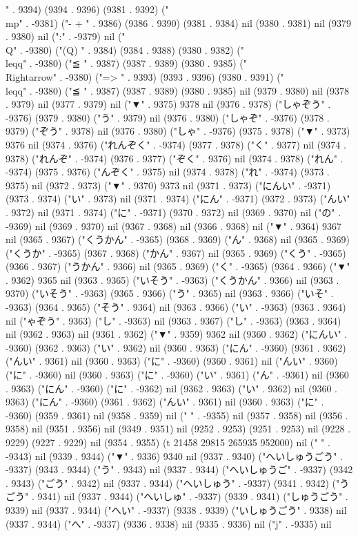 " . 9394) (9394 . 9396) (9381 . 9392) ("\\mp" . -9381) ("-
+
" . 9386) (9386 . 9390) (9381 . 9384) nil (9380 . 9381) nil (9379 . 9380) nil (":" . -9379) nil ("\\Q" . -9380) ("(Q)
" . 9384) (9384 . 9388) (9380 . 9382) ("\\leqq" . -9380) ("≦
" . 9387) (9387 . 9389) (9380 . 9385) ("\\Rightarrow" . -9380) ("=>
" . 9393) (9393 . 9396) (9380 . 9391) ("\\leqq" . -9380) ("≦
" . 9387) (9387 . 9389) (9380 . 9385) nil (9379 . 9380) nil (9378 . 9379) nil (9377 . 9379) nil ("▼" . 9375) 9378 nil (9376 . 9378) ("しゃぞう" . -9376) (9379 . 9380) ("う" . 9379) nil (9376 . 9380) ("しゃぞ" . -9376) (9378 . 9379) ("ぞう" . 9378) nil (9376 . 9380) ("しゃ" . -9376) (9375 . 9378) ("▼" . 9373) 9376 nil (9374 . 9376) ("れんぞく" . -9374) (9377 . 9378) ("く" . 9377) nil (9374 . 9378) ("れんぞ" . -9374) (9376 . 9377) ("ぞく" . 9376) nil (9374 . 9378) ("れん" . -9374) (9375 . 9376) ("んぞく" . 9375) nil (9374 . 9378) ("れ" . -9374) (9373 . 9375) nil (9372 . 9373) ("▼" . 9370) 9373 nil (9371 . 9373) ("にんい" . -9371) (9373 . 9374) ("い" . 9373) nil (9371 . 9374) ("にん" . -9371) (9372 . 9373) ("んい" . 9372) nil (9371 . 9374) ("に" . -9371) (9370 . 9372) nil (9369 . 9370) nil ("の" . -9369) nil (9369 . 9370) nil (9367 . 9368) nil (9366 . 9368) nil ("▼" . 9364) 9367 nil (9365 . 9367) ("くうかん" . -9365) (9368 . 9369) ("ん" . 9368) nil (9365 . 9369) ("くうか" . -9365) (9367 . 9368) ("かん" . 9367) nil (9365 . 9369) ("くう" . -9365) (9366 . 9367) ("うかん" . 9366) nil (9365 . 9369) ("く" . -9365) (9364 . 9366) ("▼" . 9362) 9365 nil (9363 . 9365) ("いそう" . -9363) ("くうかん" . 9366) nil (9363 . 9370) ("いそう" . -9363) (9365 . 9366) ("う" . 9365) nil (9363 . 9366) ("いそ" . -9363) (9364 . 9365) ("そう" . 9364) nil (9363 . 9366) ("い" . -9363) (9363 . 9364) nil ("ゃぞう" . 9363) ("し" . -9363) nil (9363 . 9367) ("し" . -9363) (9363 . 9364) nil (9362 . 9363) nil (9361 . 9362) ("▼" . 9359) 9362 nil (9360 . 9362) ("にんい" . -9360) (9362 . 9363) ("い" . 9362) nil (9360 . 9363) ("にん" . -9360) (9361 . 9362) ("んい" . 9361) nil (9360 . 9363) ("に" . -9360) (9360 . 9361) nil ("んい" . 9360) ("に" . -9360) nil (9360 . 9363) ("に" . -9360) ("い" . 9361) ("ん" . -9361) nil (9360 . 9363) ("にん" . -9360) ("に" . -9362) nil (9362 . 9363) ("い" . 9362) nil (9360 . 9363) ("にん" . -9360) (9361 . 9362) ("んい" . 9361) nil (9360 . 9363) ("に" . -9360) (9359 . 9361) nil (9358 . 9359) nil (" " . -9355) nil (9357 . 9358) nil (9356 . 9358) nil (9351 . 9356) nil (9349 . 9351) nil (9252 . 9253) (9251 . 9253) nil (9228 . 9229) (9227 . 9229) nil (9354 . 9355) (t 21458 29815 265935 952000) nil (" " . -9343) nil (9339 . 9344) ("▼" . 9336) 9340 nil (9337 . 9340) ("へいしゅうごう" . -9337) (9343 . 9344) ("う" . 9343) nil (9337 . 9344) ("へいしゅうご" . -9337) (9342 . 9343) ("ごう" . 9342) nil (9337 . 9344) ("へいしゅう" . -9337) (9341 . 9342) ("うごう" . 9341) nil (9337 . 9344) ("へいしゅ" . -9337) (9339 . 9341) ("しゅうごう" . 9339) nil (9337 . 9344) ("へい" . -9337) (9338 . 9339) ("いしゅうごう" . 9338) nil (9337 . 9344) ("へ" . -9337) (9336 . 9338) nil (9335 . 9336) nil ("j" . -9335) nil 